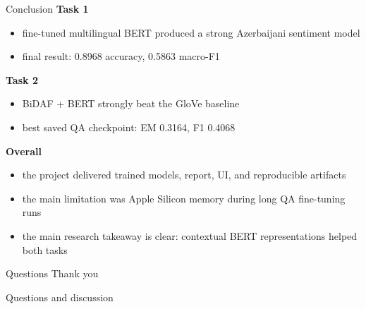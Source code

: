 \documentclass{beamer}
\begin{document}
\begin{frame}{Conclusion}
\small
\textbf{Task 1}
\begin{itemize}
  \item fine-tuned multilingual BERT produced a strong Azerbaijani sentiment model
  \item final result: 0.8968 accuracy, 0.5863 macro-F1
\end{itemize}

\vspace{0.3em}
\textbf{Task 2}
\begin{itemize}
  \item BiDAF + BERT strongly beat the GloVe baseline
  \item best saved QA checkpoint: EM 0.3164, F1 0.4068
\end{itemize}

\vspace{0.3em}
\textbf{Overall}
\begin{itemize}
  \item the project delivered trained models, report, UI, and reproducible artifacts
  \item the main limitation was Apple Silicon memory during long QA fine-tuning runs
  \item the main research takeaway is clear: contextual BERT representations helped both tasks
\end{itemize}
\end{frame}

\begin{frame}{Questions}
\centering
\Large Thank you

\vspace{0.8em}
\normalsize Questions and discussion
\end{frame}
\end{document}
